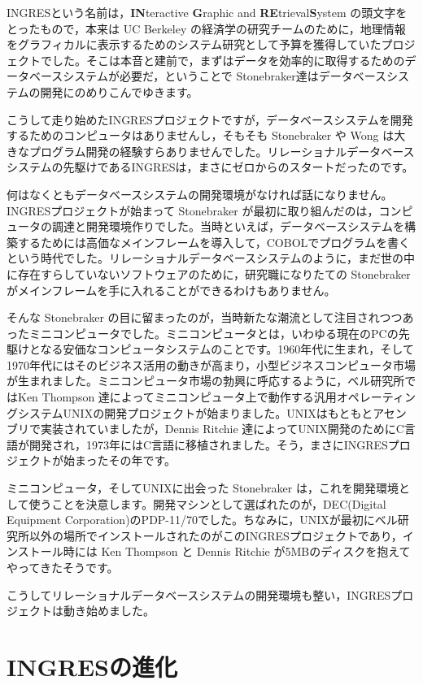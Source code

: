 INGRESという名前は，{\bf IN}teractive {\bf G}raphic and {\bf RE}trieval{\bf S}ystem の頭文字をとったもので，本来は UC Berkeley の経済学の研究チームのために，地理情報をグラフィカルに表示するためのシステム研究として予算を獲得していたプロジェクトでした。そこは本音と建前で，まずはデータを効率的に取得するためのデータベースシステムが必要だ，ということで Stonebraker達はデータベースシステムの開発にのめりこんでゆきます。


こうして走り始めたINGRESプロジェクトですが，データベースシステムを開発するためのコンピュータはありませんし，そもそも Stonebraker や Wong は大きなプログラム開発の経験すらありませんでした。リレーショナルデータベースシステムの先駆けであるINGRESは，まさにゼロからのスタートだったのです。


何はなくともデータベースシステムの開発環境がなければ話になりません。INGRESプロジェクトが始まって Stonebraker が最初に取り組んだのは，コンピュータの調達と開発環境作りでした。当時といえば，データベースシステムを構築するためには高価なメインフレームを導入して，COBOLでプログラムを書くという時代でした。リレーショナルデータベースシステムのように，まだ世の中に存在すらしていないソフトウェアのために，研究職になりたての Stonebraker がメインフレームを手に入れることができるわけもありません。


そんな Stonebraker の目に留まったのが，当時新たな潮流として注目されつつあったミニコンピュータでした。ミニコンピュータとは，いわゆる現在のPCの先駆けとなる安価なコンピュータシステムのことです。1960年代に生まれ，そして1970年代にはそのビジネス活用の動きが高まり，小型ビジネスコンピュータ市場が生まれました。ミニコンピュータ市場の勃興に呼応するように，ベル研究所ではKen Thompson 達によってミニコンピュータ上で動作する汎用オペレーティングシステムUNIXの開発プロジェクトが始まりました。UNIXはもともとアセンブリで実装されていましたが，Dennis Ritchie 達によってUNIX開発のためにC言語が開発され，1973年にはC言語に移植されました。そう，まさにINGRESプロジェクトが始まったその年です。


ミニコンピュータ，そしてUNIXに出会った Stonebraker は，これを開発環境として使うことを決意します。開発マシンとして選ばれたのが，DEC(Digital Equipment Corporation)のPDP-11/70でした。ちなみに，UNIXが最初にベル研究所以外の場所でインストールされたのがこのINGRESプロジェクトであり，インストール時には Ken Thompson と Dennis Ritchie が5MBのディスクを抱えてやってきたそうです。


こうしてリレーショナルデータベースシステムの開発環境も整い，INGRESプロジェクトは動き始めました。


\section{INGRESの進化}


